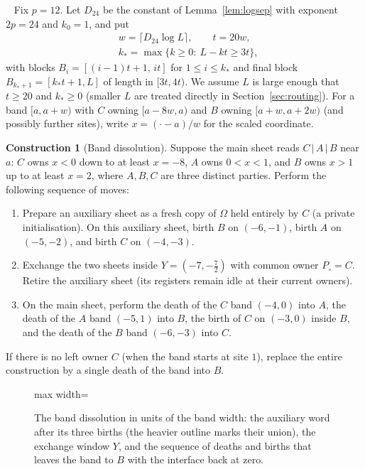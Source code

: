 \documentclass[aps,prx,reprint,superscriptaddress,floatfix,nofootinbib,longbibliography,amsmath,amssymb]{revtex4-2}
\newcommand{\Om}{\Omega}
\theoremstyle{plain}
\theoremstyle{definition}
\newtheorem{construction}[theorem]{Construction}
\newcommand{\precisely}{\par\noindent{\bfseries Precisely.}\ }
\begin{document}
\precisely
Fix $p=12$. Let $D_{24}$ be the constant of Lemma~\ref{lem:logsep} with
exponent $2p=24$ and $k_0=1$, and put
\begin{equation}\label{eq:blocks}
\begin{split}
 &w=\lceil D_{24}\log L\rceil,\qquad t=20w,\\
 &k_*=\max\{k\ge0:\ L-kt\ge 3t\},
\end{split}
\end{equation}
with blocks $B_i=[(i-1)t+1,\,it]$ for $1\le i\le k_*$ and final block
$B_{k_*+1}=[k_*t+1,L]$ of length in $[3t,4t)$. We assume $L$ is large enough
that $t\ge 20$ and $k_*\ge0$ (smaller $L$ are treated directly in Section~\ref{sec:routing}).
For a band $[a,a+w)$ with $C$ owning $[a-8w,a)$ and $B$ owning
$[a+w,a+2w)$ (and possibly further sites), write $x=(\cdot-a)/w$ for the scaled
coordinate.

\begin{construction}[Band dissolution]\label{con:band}
Suppose the main sheet reads $C\,|\,A\,|\,B$ near $a$: $C$ owns $x<0$ down to at
least $x=-8$, $A$ owns $0<x<1$, and $B$ owns $x>1$ up to at least $x=2$, where
$A,B,C$ are three distinct parties. Perform the following sequence of moves:
\begin{enumerate}[leftmargin=2em]
\item[(i)] Prepare an auxiliary sheet as a fresh copy of $\Om$ held entirely
by $C$ (a private initialisation). On this auxiliary sheet, birth $B$ on $(-6,-1)$, birth $A$ on
$(-5,-2)$, and birth $C$ on $(-4,-3)$.
\item[(ii)] Exchange the two sheets inside $Y=(-7,-\tfrac72)$ with common owner
$P_\circ=C$. Retire the auxiliary sheet (its registers remain idle at their current
owners).
\item[(iii)] On the main sheet, perform the death of the $C$ band $(-4,0)$ into $A$,
the death of the $A$ band $(-5,1)$ into $B$, the birth of $C$ on $(-3,0)$ inside
$B$, and the death of the $B$ band $(-6,-3)$ into $C$.
\end{enumerate}
If there is no left owner $C$ (when the band starts at site $1$), replace
the entire construction by a single death of the band into $B$.
\end{construction}

\begin{figure}[t]
\centering
\begin{adjustbox}{max width=\linewidth}

\end{adjustbox}
\caption{The band dissolution in units of the band width: the auxiliary word after its three births (the heavier outline marks their union), the exchange window $Y$, and the sequence of deaths and births that leaves the band to $B$ with the interface back at zero.}\label{fig:band-words}
\end{figure}
\end{document}
